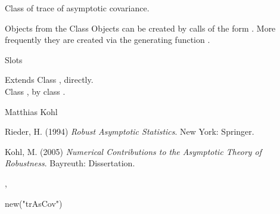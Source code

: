 \begin{Description}\relax
Class of trace of asymptotic covariance.
\end{Description}
\begin{Section}{Objects from the Class}
Objects can be created by calls of the form .
More frequently they are created via the generating function 
.
\end{Section}
\begin{Section}{Slots}
\end{Section}
\begin{Section}{Extends}
Class , directly.\\
Class , by class .
\end{Section}
\begin{Author}\relax
Matthias Kohl 
\end{Author}
\begin{References}\relax
Rieder, H. (1994) \emph{Robust Asymptotic Statistics}. New York: Springer.

Kohl, M. (2005) \emph{Numerical Contributions to the Asymptotic Theory of Robustness}. 
Bayreuth: Dissertation.
\end{References}
\begin{SeeAlso}\relax
{}, 
\end{SeeAlso}
\begin{Examples}
\begin{ExampleCode}
new("trAsCov")
\end{ExampleCode}
\end{Examples}

